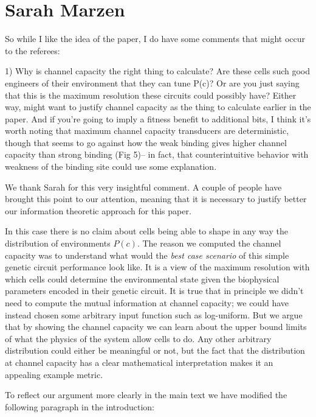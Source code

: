 \section{Sarah Marzen}

So while I like the idea of the paper, I do have some comments that might occur
to the referees:

\begin{tcolorbox}
1)  Why is channel capacity the right thing to calculate?  Are these cells such
good engineers of their environment that they can tune P(c)?  Or are you just
saying that this is the maximum resolution these circuits could possibly have?
Either way, might want to justify channel capacity as the thing to calculate
earlier in the paper.  And if you're going to imply a fitness benefit to
additional bits, I think it's worth noting that maximum channel capacity
transducers are deterministic, though that seems to go against how the weak
binding gives higher channel capacity than strong binding (Fig 5)-- in fact,
that counterintuitive behavior with weakness of the binding site could use some
explanation.
\end{tcolorbox}

We thank Sarah for this very insightful comment. A couple of people have
brought this point to our attention, meaning that it is necessary to justify
better our information theoretic approach for this paper.

In this case there is no claim about cells being able to shape in any way the
distribution of environments $P(c)$. The reason we computed the channel
capacity was to understand what would the \textit{best case scenario} of this
simple genetic circuit performance look like. It is a view of the maximum
resolution with which cells could determine the environmental state given the
biophysical parameters encoded in their genetic circuit. It is true that in
principle we didn't need to compute the mutual information at channel capacity;
we could have instead chosen some arbitrary input function such as log-uniform.
But we argue that by showing the channel capacity we can learn about the upper
bound limits of what the physics of the system allow cells to do. Any other
arbitrary distribution could either be meaningful or not, but the fact that the
distribution at channel capacity has a clear mathematical interpretation
makes it an appealing example metric.

To reflect our argument more clearly in the main text we have modified the
following paragraph in the introduction:

